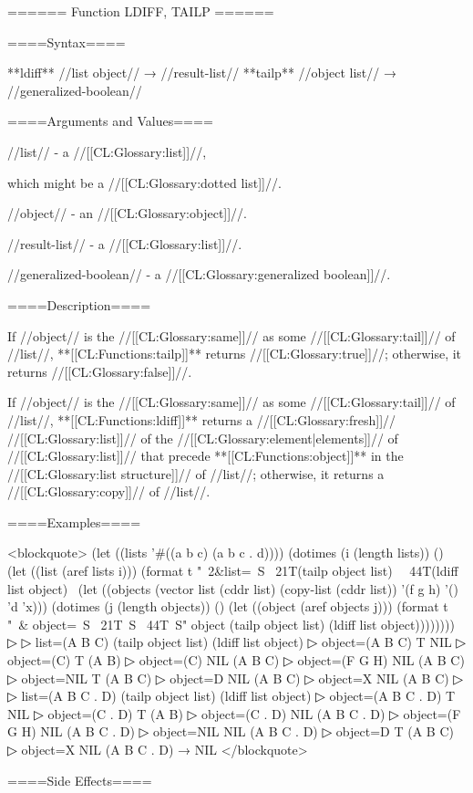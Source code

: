 ====== Function LDIFF, TAILP ======

====Syntax====

**ldiff** //list object// → //result-list// **tailp** //object list// → //generalized-boolean//

====Arguments and Values====

//list// - a //[[CL:Glossary:list]]//,

which might be a //[[CL:Glossary:dotted list]]//.

//object// - an //[[CL:Glossary:object]]//.

//result-list// - a //[[CL:Glossary:list]]//.

//generalized-boolean// - a //[[CL:Glossary:generalized boolean]]//.

====Description====

If //object// is the //[[CL:Glossary:same]]// as some //[[CL:Glossary:tail]]// of //list//, **[[CL:Functions:tailp]]** returns //[[CL:Glossary:true]]//; otherwise, it returns //[[CL:Glossary:false]]//.

If //object// is the //[[CL:Glossary:same]]// as some //[[CL:Glossary:tail]]// of //list//, **[[CL:Functions:ldiff]]** returns a //[[CL:Glossary:fresh]]// //[[CL:Glossary:list]]// of the //[[CL:Glossary:element|elements]]// of //[[CL:Glossary:list]]// that precede **[[CL:Functions:object]]** in the //[[CL:Glossary:list structure]]// of //list//; otherwise, it returns a //[[CL:Glossary:copy]]// of //list//.

====Examples====

<blockquote> (let ((lists '#((a b c) (a b c . d)))) (dotimes (i (length lists)) () (let ((list (aref lists i))) (format t "~2&list=~S ~21T(tailp object list)~ ~44T(ldiff list object)~ (let ((objects (vector list (cddr list) (copy-list (cddr list)) '(f g h) '() 'd 'x))) (dotimes (j (length objects)) () (let ((object (aref objects j))) (format t "~& object=~S ~21T~S ~44T~S" object (tailp object list) (ldiff list object))))))))
▷
▷ list=(A B C) (tailp object list) (ldiff list object)
▷ object=(A B C) T NIL
▷ object=(C) T (A B)
▷ object=(C) NIL (A B C)
▷ object=(F G H) NIL (A B C)
▷ object=NIL T (A B C)
▷ object=D NIL (A B C)
▷ object=X NIL (A B C)
▷
▷ list=(A B C . D) (tailp object list) (ldiff list object)
▷ object=(A B C . D) T NIL
▷ object=(C . D) T (A B)
▷ object=(C . D) NIL (A B C . D)
▷ object=(F G H) NIL (A B C . D)
▷ object=NIL NIL (A B C . D)
▷ object=D T (A B C)
▷ object=X NIL (A B C . D) → NIL </blockquote>

====Side Effects====

